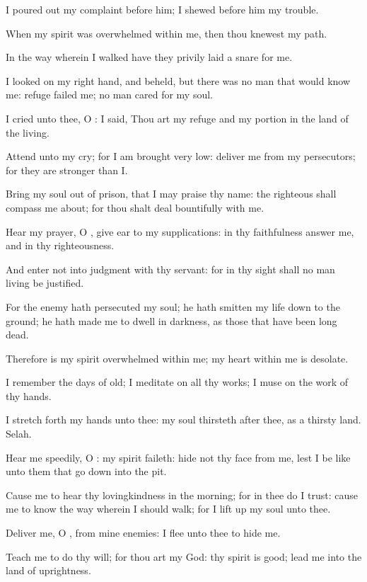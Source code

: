 \Verse I poured out my complaint before him; I shewed before him my trouble.

\Verse When my spirit was overwhelmed within me, then thou knewest my path.

In the way wherein I walked have they privily laid a snare for me.

\Verse I looked on my right hand, and beheld, but there was no man that would know me: refuge failed me; no man cared for my soul.

\Verse I cried unto thee, O \LORD: I said, Thou art my refuge and my portion in the land of the living.

\Verse Attend unto my cry; for I am brought very low: deliver me from my persecutors; for they are stronger than I.

\Verse Bring my soul out of prison, that I may praise thy name: the righteous shall compass me about; for thou shalt deal bountifully with me.




\Chapter
\Verse Hear my prayer, O \LORD, give ear to my supplications: in thy faithfulness answer me, and in thy righteousness.

\Verse And enter not into judgment with thy servant: for in thy sight shall no man living be justified.

\Verse For the enemy hath persecuted my soul; he hath smitten my life down to the ground; he hath made me to dwell in darkness, as those that have been long dead.

\Verse Therefore is my spirit overwhelmed within me; my heart within me is desolate.

\Verse I remember the days of old; I meditate on all thy works; I muse on the work of thy hands.

\Verse I stretch forth my hands unto thee: my soul thirsteth after thee, as a thirsty land. Selah.

\Verse Hear me speedily, O \LORD: my spirit faileth: hide not thy face from me, lest I be like unto them that go down into the pit.

\Verse Cause me to hear thy lovingkindness in the morning; for in thee do I trust: cause me to know the way wherein I should walk; for I lift up my soul unto thee.

\Verse Deliver me, O \LORD, from mine enemies: I flee unto thee to hide me.

\Verse Teach me to do thy will; for thou art my God: thy spirit is good; lead me into the land of uprightness.

